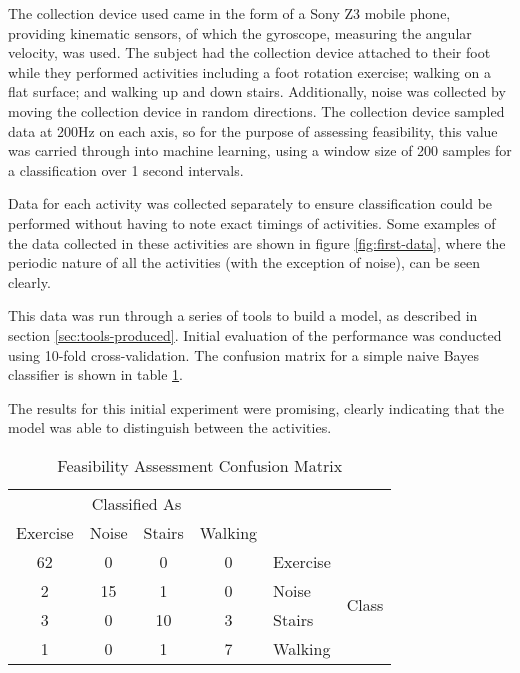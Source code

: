 The collection device used came in the form of a Sony Z3 mobile phone, providing kinematic sensors, of which the gyroscope, measuring the angular velocity, was used. The subject had the collection device attached to their foot while they performed activities including a foot rotation exercise; walking on a flat surface; and walking up and down stairs. Additionally, noise was collected by moving the collection device in random directions. The collection device sampled data at 200Hz on each axis, so for the purpose of assessing feasibility, this value was carried through into machine learning, using a window size of 200 samples for a classification over 1 second intervals.

Data for each activity was collected separately to ensure classification could be performed without having to note exact timings of activities. Some examples of the data collected in these activities are shown in figure \ref{fig:first-data}, where the periodic nature of all the activities (with the exception of noise), can be seen clearly. 

This data was run through a series of tools to build a model, as described in section \ref{sec:tools-produced}. Initial evaluation of the performance was conducted using 10-fold cross-validation. The confusion matrix for a simple naive Bayes classifier is shown in table \ref{tab:first-confusion}.

The results for this initial experiment were promising, clearly indicating that the model was able to distinguish between the activities.

\begin{table}[]
	\centering
	\caption{Feasibility Assessment Confusion Matrix \label{tab:first-confusion}}
	\begin{tabular}{|cccc|ll|}
		\hline
		\multicolumn{4}{|c|}{Classified As}   &          &                        \\
		Exercise & Noise & Stairs & Walking &          &                        \\
		\hline
		62       & 0     & 0      & 0       & Exercise & \multirow{4}{*}{Class} \\
		2        & 15    & 1      & 0       & Noise    &                        \\
		3        & 0     & 10     & 3       & Stairs   &                        \\
		1        & 0     & 1      & 7       & Walking  &                       \\
		\hline
	\end{tabular}
\end{table}


